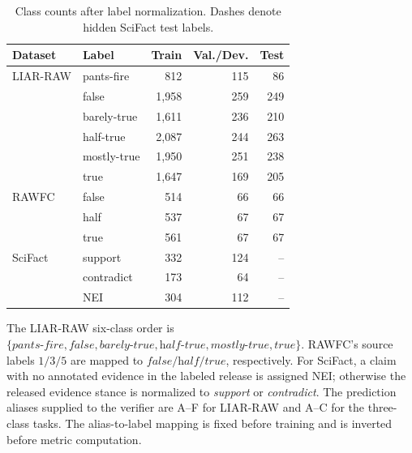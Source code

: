 \begin{table}[t]
\centering
\scriptsize
\setlength{\tabcolsep}{2pt}
\begin{tabular}{llrrr}
\toprule
\textbf{Dataset} & \textbf{Label} & \textbf{Train}
& \textbf{Val./Dev.} & \textbf{Test} \\
\midrule
LIAR-RAW & pants-fire  & 812  & 115 & 86 \\
         & false       & 1,958& 259 & 249 \\
         & barely-true & 1,611& 236 & 210 \\
         & half-true   & 2,087& 244 & 263 \\
         & mostly-true & 1,950& 251 & 238 \\
         & true        & 1,647& 169 & 205 \\
\midrule
RAWFC & false & 514 & 66 & 66 \\
      & half  & 537 & 67 & 67 \\
      & true  & 561 & 67 & 67 \\
\midrule
SciFact & support    & 332 & 124 & -- \\
        & contradict & 173 & 64  & -- \\
        & NEI        & 304 & 112 & -- \\
\bottomrule
\end{tabular}
\caption{Class counts after label normalization.  Dashes denote hidden
SciFact test labels.}
\label{tab:supp-class-counts}
\end{table}

The LIAR-RAW six-class order is
\(\{\textit{pants-fire},\textit{false},\textit{barely-true},
\textit{half-true},\textit{mostly-true},\textit{true}\}\).
RAWFC's source labels \(1/3/5\) are mapped to
\(\textit{false}/\textit{half}/\textit{true}\), respectively.
For SciFact, a claim with no annotated evidence in the labeled release is
assigned NEI; otherwise the released evidence stance is normalized to
\textit{support} or \textit{contradict}.  The prediction aliases supplied
to the verifier are A--F for LIAR-RAW and A--C for the three-class tasks.
The alias-to-label mapping is fixed before training and is inverted before
metric computation.

